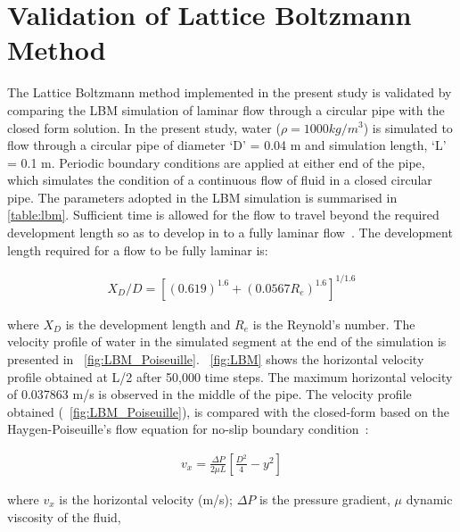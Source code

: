 
\section{Validation of Lattice Boltzmann Method}

The Lattice Boltzmann method implemented in the present study is validated by 
comparing the LBM simulation of laminar flow  through a circular pipe with the 
closed form solution. In the present study, water ($\rho=1000 kg/m^{3}$) is 
simulated to flow through a circular pipe of diameter `D' = 0.04 m and 
simulation length, `L' = 0.1 m. Periodic boundary conditions are applied at 
either end of the pipe, which simulates the condition of a continuous flow of 
fluid in a closed circular pipe. The parameters adopted in the LBM simulation 
is summarised in \cref{table:lbm}. Sufficient time is allowed for the flow to 
travel beyond the required development length so as to develop in to a fully 
laminar flow~\citet{Durst2005}. The development length required for a flow to 
be fully laminar is:

\begin{align}
X_{D}/D=[(0.619)^{1.6}+(0.0567 R_{e})^{1.6}]^{1/1.6}
\end{align}

where $X_{D}$ is the development length and $R_{e}$ is the Reynold's number. 
The velocity profile of water in the simulated segment at the end of the 
simulation is presented in ~\cref{fig:LBM_Poiseuille}. ~\cref{fig:LBM} shows 
the horizontal velocity profile obtained at L/2 after 50,000 time steps. The 
maximum horizontal velocity of 0.037863 m/s is observed in the middle of the 
pipe. The velocity profile obtained (~\cref{fig:LBM_Poiseuille}), is compared 
with the closed-form based on the Haygen-Poiseuille's flow equation for no-slip 
boundary condition~\citep{Willis2008}:

\begin{align}
\mathit{v}_{\mathit{x}}=\frac{\Delta P}{2 \mu L} [\frac{D^{2}}{4}-y^{2}]
\end{align}

where $v_{x}$ is the horizontal velocity (m/s); $\Delta P$ is the pressure 
gradient, $\mu$ dynamic viscosity of the fluid, 


